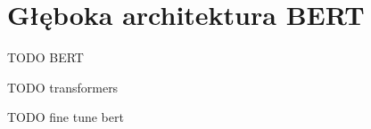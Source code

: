 \section{Głęboka architektura BERT}

TODO \cite{devlin2018bert} BERT

TODO \cite{wolf2019huggingfaces} transformers

TODO \cite{sun2019finetune} fine tune bert


